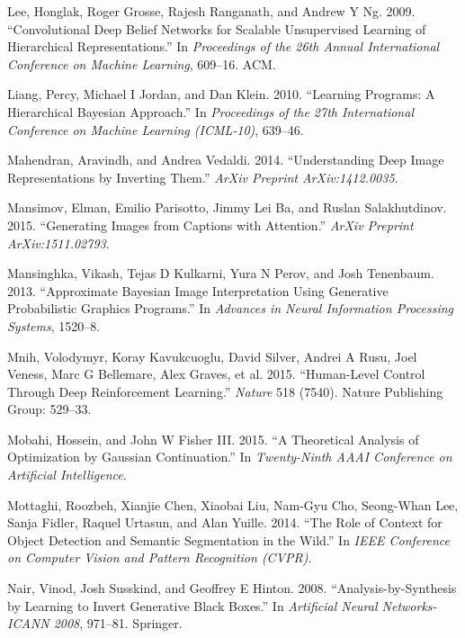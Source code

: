 \documentclass[12pt,twoside]{mitthesis}
\begin{document}
\hypertarget{ref-lee2009convolutional}{}
Lee, Honglak, Roger Grosse, Rajesh Ranganath, and Andrew Y Ng. 2009.
``Convolutional Deep Belief Networks for Scalable Unsupervised Learning
of Hierarchical Representations.'' In \emph{Proceedings of the 26th
Annual International Conference on Machine Learning}, 609--16. ACM.

\hypertarget{ref-liang2010learning}{}
Liang, Percy, Michael I Jordan, and Dan Klein. 2010. ``Learning
Programs: A Hierarchical Bayesian Approach.'' In \emph{Proceedings of
the 27th International Conference on Machine Learning (ICML-10)},
639--46.

\hypertarget{ref-mahendran2014understanding}{}
Mahendran, Aravindh, and Andrea Vedaldi. 2014. ``Understanding Deep
Image Representations by Inverting Them.'' \emph{ArXiv Preprint
ArXiv:1412.0035}.

\hypertarget{ref-mansimov2015generating}{}
Mansimov, Elman, Emilio Parisotto, Jimmy Lei Ba, and Ruslan
Salakhutdinov. 2015. ``Generating Images from Captions with Attention.''
\emph{ArXiv Preprint ArXiv:1511.02793}.

\hypertarget{ref-mansinghka2013approximate}{}
Mansinghka, Vikash, Tejas D Kulkarni, Yura N Perov, and Josh Tenenbaum.
2013. ``Approximate Bayesian Image Interpretation Using Generative
Probabilistic Graphics Programs.'' In \emph{Advances in Neural
Information Processing Systems}, 1520--8.

\hypertarget{ref-mnih2015human}{}
Mnih, Volodymyr, Koray Kavukcuoglu, David Silver, Andrei A Rusu, Joel
Veness, Marc G Bellemare, Alex Graves, et al. 2015. ``Human-Level
Control Through Deep Reinforcement Learning.'' \emph{Nature} 518 (7540).
Nature Publishing Group: 529--33.

\hypertarget{ref-mobahi2015theoretical}{}
Mobahi, Hossein, and John W Fisher III. 2015. ``A Theoretical Analysis
of Optimization by Gaussian Continuation.'' In \emph{Twenty-Ninth AAAI
Conference on Artificial Intelligence}.

\hypertarget{ref-mottaghi2014role}{}
Mottaghi, Roozbeh, Xianjie Chen, Xiaobai Liu, Nam-Gyu Cho, Seong-Whan
Lee, Sanja Fidler, Raquel Urtasun, and Alan Yuille. 2014. ``The Role of
Context for Object Detection and Semantic Segmentation in the Wild.'' In
\emph{IEEE Conference on Computer Vision and Pattern Recognition
(CVPR)}.

\hypertarget{ref-nair2008analysis}{}
Nair, Vinod, Josh Susskind, and Geoffrey E Hinton. 2008.
``Analysis-by-Synthesis by Learning to Invert Generative Black Boxes.''
In \emph{Artificial Neural Networks-ICANN 2008}, 971--81. Springer.
\end{document}
